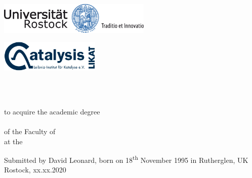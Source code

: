 
\begin{titlepage}

\begin{addmargin}[-1cm]{-3cm}

\centering
\begin{minipage}{0.45\textwidth}
   \centering
   \includegraphics[height=1.5cm]{gfx/uniro-logo} %
\end{minipage}\hfill
\begin{minipage}{0.45\textwidth}
   \centering
   \includegraphics[height=1.5cm]{gfx/likat-logo} %
\end{minipage}


\begin{center}
\large

\hfill
\vspace{8cm}

\begingroup
\Large{\spacedallcaps{\textbf{\myTitle}}} \\ \bigskip %
\endgroup



\vspace{2cm}


\textbf{\mySubtitle} \\ \medskip %
to acquire the academic degree \\
\myDegree \\
of the Faculty of \myFaculty \\
at the \myUni \\ %


\vspace{6cm}

Submitted by David Leonard, born on 18\textsuperscript{th} November 1995 in Rutherglen, UK\\
Rostock, xx.xx.2020
\vfill

\end{center}
\end{addmargin}

\end{titlepage}
